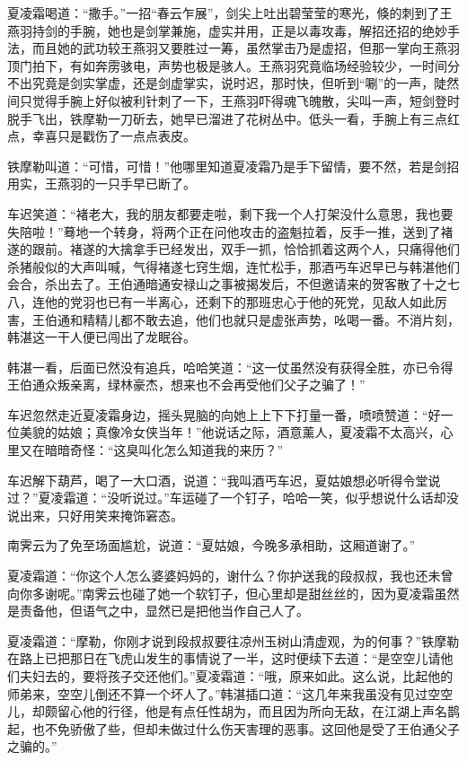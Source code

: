 \documentclass[12pt,oneside]{book}
\begin{document}
夏凌霜喝道：``撒手。''一招``春云乍展''，剑尖上吐出碧莹莹的寒光，倏的刺到了王燕羽持剑的手腕，她也是剑掌兼施，虚实并用，正是以毒攻毒，解招还招的绝妙手法，而且她的武功较王燕羽又要胜过一筹，虽然掌击乃是虚招，但那一掌向王燕羽顶门拍下，有如奔雳骇电，声势也极是骇人。王燕羽究竟临场经验较少，一时间分不出究竟是剑实掌虚，还是剑虚掌实，说时迟，那时快，但听到``唰''的一声，陡然间只觉得手腕上好似被利针刺了一下，王燕羽吓得魂飞魄散，尖叫一声，短剑登时脱手飞出，铁摩勒一刀斫去，她早已溜进了花树丛中。低头一看，手腕上有三点红点，幸喜只是戳伤了一点点表皮。

铁摩勒叫道：``可惜，可惜！''他哪里知道夏凌霜乃是手下留情，要不然，若是剑招用实，王燕羽的一只手早已断了。

车迟笑道：``褚老大，我的朋友都要走啦，剩下我一个人打架没什么意思，我也要失陪啦！''蓦地一个转身，将两个正在问他攻击的盗魁拉着，反手一推，送到了褚遂的跟前。褚遂的大擒拿手已经发出，双手一抓，恰恰抓着这两个人，只痛得他们杀猪般似的大声叫喊，气得褚遂七窍生烟，连忙松手，那酒丐车迟早已与韩湛他们会合，杀出去了。王伯通暗通安禄山之事被揭发后，不但邀请来的贺客散了十之七八，连他的党羽也已有一半离心，还剩下的那班忠心于他的死党，见敌人如此厉害，王伯通和精精儿都不敢去追，他们也就只是虚张声势，吆喝一番。不消片刻，韩湛这一干人便已闯出了龙眠谷。

韩湛一看，后面已然没有追兵，哈哈笑道：``这一仗虽然没有获得全胜，亦已令得王伯通众叛亲离，绿林豪杰，想来也不会再受他们父子之骗了！''

车迟忽然走近夏凌霜身边，摇头晃脑的向她上上下下打量一番，喷喷赞道：``好一位美貌的姑娘；真像冷女侠当年！''他说话之际，酒意薰人，夏凌霜不太高兴，心里又在暗暗奇怪：``这臭叫化怎么知道我的来历？''

车迟解下葫芦，喝了一大口酒，说道：``我叫酒丐车迟，夏姑娘想必听得令堂说过？''夏凌霜道：``没听说过。''车运碰了一个钉子，哈哈一笑，似乎想说什么话却没说出来，只好用笑来掩饰窘态。

南霁云为了免至场面尴尬，说道：``夏姑娘，今晚多承相助，这厢道谢了。''

夏凌霜道：``你这个人怎么婆婆妈妈的，谢什么？你护送我的段叔叔，我也还未曾向你多谢呢。''南霁云也碰了她一个软钉子，但心里却是甜丝丝的，因为夏凌霜虽然是责备他，但语气之中，显然已是把他当作自己人了。

夏凌霜道：``摩勒，你刚才说到段叔叔要往凉州玉树山清虚观，为的何事？''铁摩勒在路上已把那日在飞虎山发生的事情说了一半，这时便续下去道：``是空空儿请他们夫妇去的，要将孩子交还他们。''夏凌霜道：``哦，原来如此。这么说，比起他的师弟来，空空儿倒还不算一个坏人了。''韩湛插口道：``这几年来我虽没有见过空空儿，却颇留心他的行径，他是有点任性胡为，而且因为所向无敌，在江湖上声名鹊起，也不免骄傲了些，但却未做过什么伤天害理的恶事。这回他是受了王伯通父子之骗的。''
\end{document}
